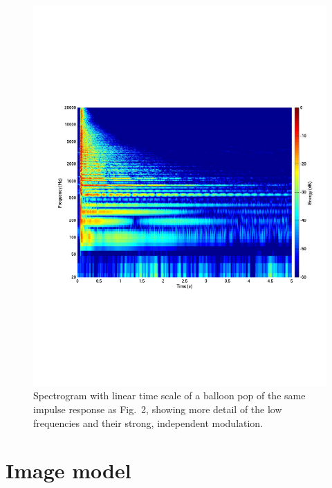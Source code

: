 \documentclass{aes137}
\begin{document}
%

\begin{figure}[h!] \centering \includegraphics[width=\linewidth]{images/P14IR_sgm_cropped.pdf} \caption{Spectrogram with linear time scale of a balloon pop of the same impulse response as Fig.~2, showing more detail of the low frequencies and their strong, independent modulation.} \end{figure}

\section{Image model}
\end{document}
